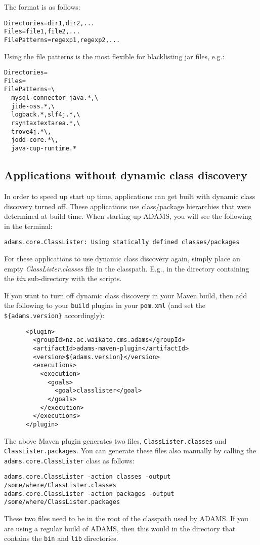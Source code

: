 \noindent The format is as follows:

\begin{verbatim}
Directories=dir1,dir2,...
Files=file1,file2,...
FilePatterns=regexp1,regexp2,...
\end{verbatim}

\noindent Using the file patterns is the most flexible for blacklisting jar files, e.g.:

\begin{verbatim}
Directories=
Files=
FilePatterns=\
  mysql-connector-java.*,\
  jide-oss.*,\
  logback.*,slf4j.*,\
  rsyntaxtextarea.*,\
  trove4j.*\,
  jodd-core.*\,
  java-cup-runtime.*
\end{verbatim}

\subsection{Applications without dynamic class discovery}
In order to speed up start up time, applications can get built with
dynamic class discovery turned off. These applications use class/package
hierarchies that were determined at build time. When starting up ADAMS, you
will see the following in the terminal:
\begin{verbatim}
adams.core.ClassLister: Using statically defined classes/packages
\end{verbatim}
For these applications to use dynamic class discovery again, simply place
an empty \textit{ClassLister.classes} file in the classpath. E.g., in the
directory containing the \textit{bin} sub-directory with the scripts.

If you want to turn off dynamic class discovery in your Maven build, then
add the following to your \texttt{build} plugins in your \texttt{pom.xml}
(and set the \verb|${adams.version}| accordingly):
\begin{verbatim}
      <plugin>
        <groupId>nz.ac.waikato.cms.adams</groupId>
        <artifactId>adams-maven-plugin</artifactId>
        <version>${adams.version}</version>
        <executions>
          <execution>
            <goals>
              <goal>classlister</goal>
            </goals>
          </execution>
        </executions>
      </plugin>
\end{verbatim}
The above Maven plugin generates two files, \texttt{ClassLister.classes}
and \texttt{ClassLister.packages}. You can generate these files also manually
by calling the \texttt{adams.core.ClassLister} class as follows:
\begin{verbatim}
adams.core.ClassLister -action classes -output /some/where/ClassLister.classes
adams.core.ClassLister -action packages -output /some/where/ClassLister.packages
\end{verbatim}
These two files need to be in the root of the classpath used by ADAMS. If you
are using a regular build of ADAMS, then this would in the directory that
contains the \texttt{bin} and \texttt{lib} directories.

